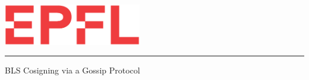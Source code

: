 
%        




\newcommand{\logoepfl}[0]{
  \begin{center}
    \includegraphics[width=6cm]{logo_epfl_coul.eps}
  \end{center}
  \vspace{0.3cm}
  \hrule
}
\newcommand{\project}[1]{
  \begin{center}
    \large{#1}
  \end{center}
  \vspace{1cm}
}
\newcommand{\department}[1]{
  \begin{center}
    \large{#1}
  \end{center}
}
\newcommand{\lab}[1]{
  \begin{center}
    \large{#1}
  \end{center}
}
\newcommand{\supervisor}[3]{
  \begin{center}
    \begin{normalsize}{
        \bf #1}\\#2\\#3
    \end{normalsize}
  \end{center}
}
\renewcommand{\author}[1]{
  \begin{center}
    \Large{#1}
  \end{center}
  \vspace{0.5cm}
}
\renewcommand{\title}[1]{
  \vspace{3cm}
  \begin{center}
    \huge{#1}
  \end{center}
  \vspace{1.7cm}
}
\renewcommand{\date}[2]{
  \begin{center}
    \normalsize{#1 #2}
  \end{center}
  \vspace{0.5cm}
}


\thispagestyle{empty}


  \logoepfl

  \title{BLS Cosigning via a Gossip Protocol}

